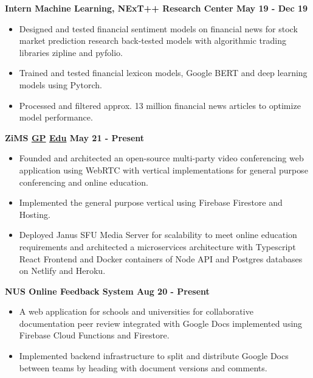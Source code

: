 \documentclass[11pts]{article}
\begin{document}
\noindent \centerline{\large \bf Intern Machine Learning, NExT++ Research Center \href{https://github.com/GelliFrancesco/assetpriceprediction}{\faGithub} \hfill May 19 - Dec 19}
\begin{itemize}
    \item Designed and tested financial sentiment models on financial news for stock market prediction research back-tested models with algorithmic trading libraries zipline and pyfolio.
    \item Trained and tested financial lexicon models, Google BERT and deep learning models using Pytorch.
    \item Processed and filtered approx. 13 million financial news articles to optimize model performance.
\end{itemize}
\smallskip

\smallskip

\noindent \centerline{\large \bf ZiMS \href{https://github.com/yzia2000/zims-mesh}{\faGithub GP} \href{https://github.com/yzia2000/zims}{\faGithub Edu} \hfill May 21 - Present}
\begin{itemize}
    \item Founded and architected an open-source multi-party video conferencing web application using WebRTC with vertical implementations for general purpose conferencing and online education.
    \item Implemented the general purpose vertical using Firebase Firestore and Hosting.
    \item Deployed Janus SFU Media Server for scalability to meet online education requirements and architected a microservices architecture with Typescript React Frontend and Docker containers of Node API and Postgres databases on Netlify and Heroku.
\end{itemize}
\smallskip

\noindent \centerline{\large \bf NUS Online Feedback System \href{https://youtu.be/LVmKodrE8e0}{\faYoutube} \hfill Aug 20 - Present}
\begin{itemize}
    \item A web application for schools and universities for collaborative documentation peer review integrated with Google Docs implemented using Firebase Cloud Functions and Firestore.
    \item Implemented backend infrastructure to split and distribute Google Docs between teams by heading with document versions and comments.
\end{itemize}
\smallskip
\end{document}
